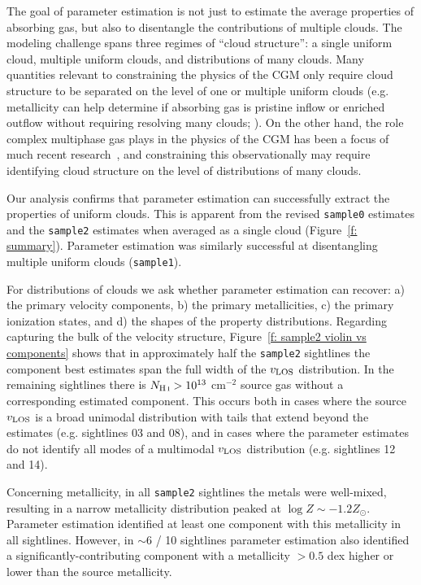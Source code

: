 \documentclass[fleqn,usenatbib]{mnras}
\begin{document}
The goal of parameter estimation is not just to estimate the average properties of absorbing gas,
but also to disentangle the contributions of multiple clouds.
The modeling challenge spans three regimes of ``cloud structure'':
a single uniform cloud,
multiple uniform clouds,
and distributions of many clouds.
Many quantities relevant to constraining the physics of the CGM only require cloud structure to be separated on the level of one or multiple uniform clouds (e.g. metallicity can help determine if absorbing gas is pristine inflow or enriched outflow without requiring resolving many clouds; \citealt{hafen2017Lowredshift}).
On the other hand, the role complex multiphase gas plays in the physics of the CGM has been a focus of much recent research~\citep[e.g.][]{voit2015Precipitationregulated, esmerian2021Thermal, smith2023Arkenstone, tan2023Cloudy},
and constraining this observationally may require identifying cloud structure on the level of distributions of many clouds.

Our analysis confirms that parameter estimation can successfully extract the properties of uniform clouds.
This is apparent from the revised \texttt{sample0} estimates and the \texttt{sample2} estimates when averaged as a single cloud (Figure~\ref{f: summary}).
Parameter estimation was similarly successful at disentangling multiple uniform clouds (\texttt{sample1}).

For distributions of clouds we ask whether parameter estimation can recover:
a) the primary velocity components,
b) the primary metallicities,
c) the primary ionization states, and
d) the shapes of the property distributions.
Regarding capturing the bulk of the velocity structure, Figure~\ref{f: sample2 violin vs components} shows that in approximately half the \texttt{sample2} sightlines the component best estimates span the full width of the $v_{\rm LOS}$ distribution.
In the remaining sightlines there is $N_{\ion{H}{I}}>10^{13}$ cm$^{-2}$ source gas without a corresponding estimated component.
This occurs both in cases where the source $v_{\rm LOS}$ is a broad unimodal distribution with tails that extend beyond the estimates (e.g. sightlines 03 and 08),
and in cases where the parameter estimates do not identify all modes of a multimodal $v_{\rm LOS}$ distribution (e.g. sightlines 12 and 14).

Concerning metallicity, in all \texttt{sample2} sightlines the metals were well-mixed, resulting in a narrow metallicity distribution peaked at $\log Z \sim -1.2 Z_\odot$.
Parameter estimation identified at least one component with this metallicity in all sightlines.
However, in $\sim 6$ / 10 sightlines parameter estimation also identified a significantly-contributing component with a metallicity $>0.5$ dex higher or lower than the source metallicity.
\end{document}
